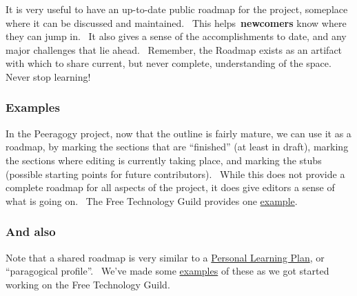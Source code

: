 It is very useful to have an up-to-date public roadmap for the project,
someplace where it can be discussed and maintained.~ This
helps~\textbf{newcomers} know where they can jump in.~ It also gives a
sense of the accomplishments to date, and any major challenges that lie
ahead.~ Remember, the Roadmap exists as an artifact with which to share
current, but never complete, understanding of the space.~ Never stop
learning!

\subsubsection{Examples}

\textbf{}In the Peeragogy project, now that the outline is fairly
mature, we can use it as a roadmap, by marking the sections that are
``finished'' (at least in draft), marking the sections where editing is
currently taking place, and marking the stubs (possible starting points
for future contributors).~ While this does not provide a complete
roadmap for all aspects of the project, it does give editors a sense of
what is going on.~ The Free Technology Guild provides one
\href{http://campus.ftacademy.org/wiki/index.php/Free\_Technology\_Guild\_Roadmap}{example}.

\subsubsection{And also}

Note that a shared roadmap is very similar to a
\href{http://peeragogy.org/to-peeragogy/personal-learning-plan/}{Personal
Learning Plan}, or ``paragogical profile''.~ We've made some
\href{http://campus.ftacademy.org/wiki/index.php/Free\_Technology\_Guild\#Learning\_design}{examples}
of these as we got started working on the Free Technology Guild. ~
